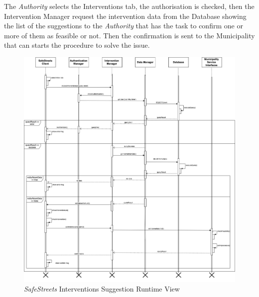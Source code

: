 \documentclass{article}
\begin{document}
	The {\it Authority} selects the Interventions tab, the authorisation is checked, then the Intervention Manager request the intervention data from the Database showing the list of the suggestions to the {\it Authority} that has the task to confirm one or more of them as feasible or not. Then the confirmation is sent to the Municipality that can starts the procedure to solve the issue.  
	\begin{figure}[H]
			\centering
			\includegraphics[scale=0.24]{Images/Diagrams/Runtime/interventions_runtime.png}
			\caption{{\it SafeStreets} Interventions Suggestion Runtime View}
	\end{figure}
	\pagebreak
	\noindent
\end{document}
